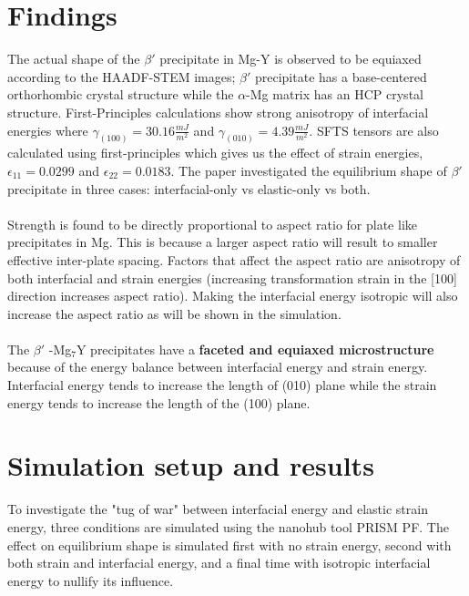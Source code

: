 \documentclass[11pt]{article}
\newcommand{\bprime} {$\beta'$ }
\begin{document}
\section*{Findings}
The actual shape of the \bprime precipitate in Mg-Y is observed to be equiaxed according to the HAADF-STEM images; \bprime precipitate has a base-centered orthorhombic crystal structure while the $\alpha$-Mg matrix has an HCP crystal structure. 
First-Principles calculations show strong anisotropy of interfacial energies where 
$\gamma_{(100)} = 30.16\frac{mJ}{m^2}$ and $\gamma_{(010)} = 4.39\frac{mJ}{m^2}$. 
SFTS tensors are also calculated using first-principles which gives us the effect of strain energies, 
$\epsilon_{11}=0.0299$ and $\epsilon_{22}=0.0183$. 
The paper investigated the equilibrium shape of \bprime precipitate in three cases: interfacial-only vs elastic-only vs both.
\\~\\
Strength is found to be directly proportional to aspect ratio for plate like precipitates in Mg. This is because a larger aspect ratio will result to smaller effective inter-plate spacing. 
Factors that affect the aspect ratio are anisotropy of both interfacial and strain energies (increasing transformation strain in the [100] direction increases aspect ratio). 
Making the interfacial energy isotropic will also increase the aspect ratio as will be shown in the simulation.
\\~\\
The \bprime-Mg$_7$Y precipitates have a \textbf{faceted and equiaxed microstructure} because of the 
energy balance between interfacial energy and strain energy. Interfacial energy tends to increase the length of (010) plane while the strain energy tends to increase the length of the (100) plane.

\section*{Simulation setup and results}
To investigate the "tug of war" between interfacial energy and elastic strain energy, three conditions are simulated
 using the nanohub tool PRISM PF. The effect on equilibrium shape is simulated first with no strain energy, second with both strain and interfacial energy, 
 and a final time with isotropic interfacial energy to nullify its influence.
\end{document}

